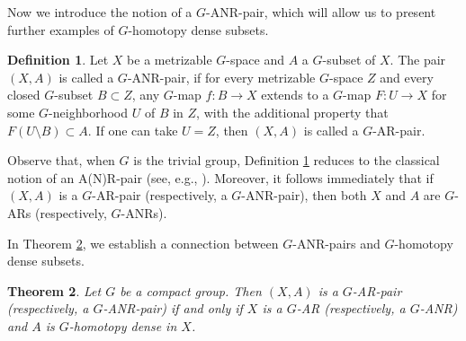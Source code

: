 \documentclass[12pt]{amsart}
\newtheorem{theorem}{Theorem}[section]
\newtheorem{lemma}[theorem]{Lemma}
\theoremstyle{definition}
\newtheorem{definition}[theorem]{Definition}
\begin{document}
	Now we introduce the notion of a $G$-ANR-pair, which will allow us to present further examples of $G$-homotopy dense subsets.
	
	\begin{definition}\label{G-ANR-pair}
		Let $X$ be a metrizable $G$-space and $A$ a $G$-subset of $X$. The pair $(X,A)$ is called a $G$-ANR-pair, if for every metrizable $G$-space $Z$ and every closed $G$-subset $B \subset Z$, any $G$-map $f : B \to X$ extends to a $G$-map $F : U \to X$ for some $G$-neighborhood $U$ of $B$ in $Z$, with the additional property that $F(U \setminus B) \subset A$. If one can take $U = Z$, then $(X,A)$ is called a $G$-AR-pair.
	\end{definition}
	
	Observe that, when $G$ is the trivial group, Definition \ref{G-ANR-pair} reduces to the classical notion of an A(N)R-pair (see, e.g., \cite[p. 266]{VM2}). Moreover, it follows immediately that if $(X,A)$ is a $G$-AR-pair (respectively, a $G$-ANR-pair), then both $X$ and $A$ are $G$-ARs (respectively, $G$-ANRs).
	
	In Theorem \ref{G-pair and G-homotopy dense}, we establish a connection between $G$-ANR-pairs and $G$-homotopy dense subsets. 
	
	
	
	
	\begin{theorem}\label{G-pair and G-homotopy dense}
		\rm{Let $G$ be a compact group. Then $(X,A)$ is a $G$-AR-pair (respectively, a $G$-ANR-pair) if and only if $X$ is a $G$-AR (respectively, a $G$-ANR) and $A$ is $G$-homotopy dense in $X$.}
	\end{theorem}
	
\end{document}
